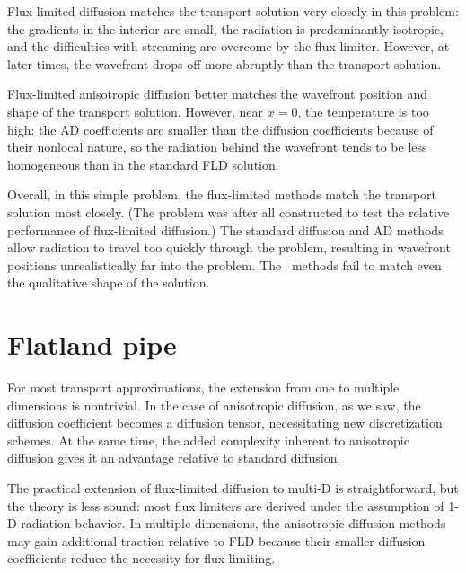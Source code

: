 Flux-limited diffusion matches the transport solution very closely in this
problem: the gradients in the interior are small, the radiation is predominantly
isotropic, and the difficulties with streaming are overcome by the flux limiter.
However, at later times, the wavefront drops off more abruptly than the
transport solution.

Flux-limited anisotropic diffusion better matches the wavefront position and
shape of the transport solution. However, near $x=0$, the temperature is too
high: the AD coefficients are smaller than the diffusion coefficients
because of their nonlocal nature, so the radiation behind the wavefront tends to
be less homogeneous than in the standard FLD solution.


Overall, in this simple problem, the flux-limited methods match the transport
solution most closely. (The problem was after all constructed to test the
relative performance of flux-limited diffusion.) The standard diffusion
and AD methods allow radiation to travel too quickly through the problem,
resulting in wavefront positions unrealistically far into the problem. The
\Pone\ methods fail to match even the qualitative shape of the solution.

\section{Flatland pipe}

For most transport approximations, the extension from one to multiple
dimensions is nontrivial. In the case of anisotropic diffusion, as we saw, the
diffusion coefficient becomes a diffusion tensor, necessitating new
discretization schemes. At the same time, the added complexity inherent
to anisotropic
diffusion gives it an advantage relative to standard diffusion.

The practical extension of flux-limited diffusion to multi-D is straightforward,
but the theory is less sound: most flux limiters are derived under
the assumption of 1-D radiation behavior. In multiple dimensions, the
anisotropic diffusion methods may gain additional traction relative to FLD
because their smaller diffusion coefficients reduce the necessity for flux
limiting.

